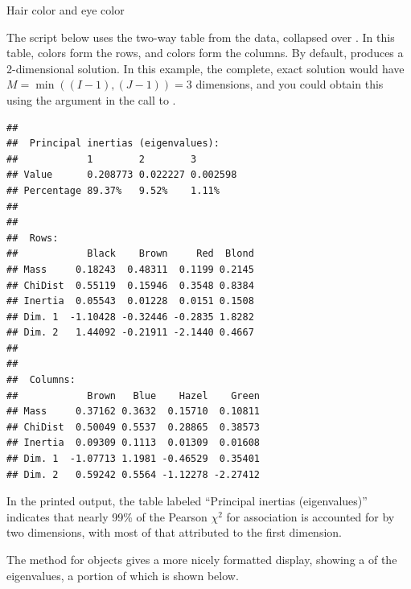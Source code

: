 \documentclass[11pt]{book}
\renewenvironment{knitrout}{\small\renewcommand{\baselinestretch}{.85}}{} %
\begin{document}
\begin{Example}[haireye3]{Hair color and eye color}

The script below uses the two-way table  from the
 data, collapsed over .
In this table,  colors form the rows, and  colors
form the columns.  By default,  produces a 2-dimensional
solution.  In this example, the complete, exact solution would
have $M = \min((I-1), (J-1)) = 3$ dimensions, and you could obtain this
using the argument  in the call to .

\begin{knitrout}
\color{fgcolor}\begin{kframe}
\begin{alltt}
 \hlkwb{<-}  \hlopt{:}\hlstd{)}
 \hlkwb{<-} 
\end{alltt}
\begin{verbatim}
## 
##  Principal inertias (eigenvalues):
##            1        2        3       
## Value      0.208773 0.022227 0.002598
## Percentage 89.37%   9.52%    1.11%   
## 
## 
##  Rows:
##            Black    Brown     Red  Blond
## Mass     0.18243  0.48311  0.1199 0.2145
## ChiDist  0.55119  0.15946  0.3548 0.8384
## Inertia  0.05543  0.01228  0.0151 0.1508
## Dim. 1  -1.10428 -0.32446 -0.2835 1.8282
## Dim. 2   1.44092 -0.21911 -2.1440 0.4667
## 
## 
##  Columns:
##            Brown   Blue    Hazel    Green
## Mass     0.37162 0.3632  0.15710  0.10811
## ChiDist  0.50049 0.5537  0.28865  0.38573
## Inertia  0.09309 0.1113  0.01309  0.01608
## Dim. 1  -1.07713 1.1981 -0.46529  0.35401
## Dim. 2   0.59242 0.5564 -1.12278 -2.27412
\end{verbatim}
\end{kframe}
\end{knitrout}
In the printed output, the table labeled ``Principal inertias (eigenvalues)''
indicates that nearly 99\% of the
Pearson
\(\chi^2\) for association is accounted for by two dimensions, with
most of that attributed to the first dimension.

The  method for  objects gives a more nicely formatted
display, showing a  of the eigenvalues, a portion of
which is shown below.


\end{Example}
\end{document}
